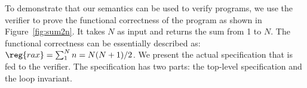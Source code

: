 

To demonstrate that our semantics can be used to verify \ISA programs, we use the \ISA verifier to prove the functional correctness of the  program as shown in Figure~\ref{fig:sum2n}.
It takes $N$ as input and returns the sum from 1 to $N$.
The functional correctness can be essentially described as: $\reg{rax} = \sum_1^N n = N (N + 1) / {2}$.
%
We present the actual specification that is fed to the \ISA verifier.
The specification has two parts: the top-level specification and the loop invariant.






